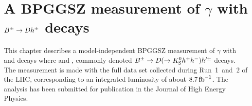

\chapter{\texorpdfstring{A BPGGSZ measurement of $\gamma$ with ${{B}^\pm}\rightarrow{\ensuremath{D}} h^\pm$ decays}{A BPGGSZ measurement of gamma with B->Dh decays}}
\label{ch:5-GGSZ-measurement}


This chapter describes a model-independent BPGGSZ measurement of $\gamma$ with \BtoDK and \BtoDpi decays where \DtoKspipi and \DtoKsKK, commonly denoted ${{B}^\pm}\rightarrow{\ensuremath{D}}(\rightarrow{\ensuremath{{K}^0_{\mathrm{S}}}} h^+h^-)h'^\pm$ decays. The measurement is made with the full \lhcb data set collected during Run~1~and~2 of the LHC, corresponding to an integrated luminosity of about $8.7\text{\,fb}^{-1}$. The analysis has been submitted for publication in the Journal of High Energy Physics.






